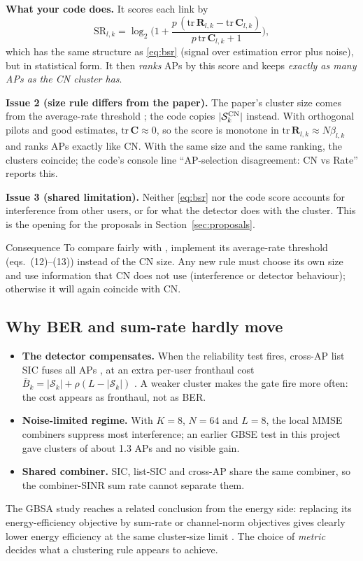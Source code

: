 \documentclass[11pt]{article}
\begin{document}
\textbf{What your code does.} It scores each link by
\begin{equation}
  \mathrm{SR}_{l,k}=\log_2\!\Big(1+\frac{p\,(\mathrm{tr}\,\mathbf R_{l,k}-\mathrm{tr}\,\mathbf C_{l,k})}{p\,\mathrm{tr}\,\mathbf C_{l,k}+1}\Big),
\end{equation}
which has the same structure as \eqref{eq:bsr} (signal over estimation error plus noise), but in statistical form. It then \emph{ranks} APs by this score and keeps \emph{exactly as many APs as the CN cluster has}.

\textbf{Issue 2 (size rule differs from the paper).} The paper's cluster size comes from the average-rate threshold \cite[eqs.~(12)--(13)]{mashdour2024study}; the code copies $|\mathcal S^{\rm CN}_k|$ instead. With orthogonal pilots and good estimates, $\mathrm{tr}\,\mathbf C\approx0$, so the score is monotone in $\mathrm{tr}\,\mathbf R_{l,k}\approx N\beta_{l,k}$ and ranks APs exactly like CN. With the same size and the same ranking, the clusters coincide; the code's console line ``AP-selection disagreement: CN vs Rate'' reports this.

\textbf{Issue 3 (shared limitation).} Neither \eqref{eq:bsr} nor the code score accounts for interference from other users, or for what the detector does with the cluster. This is the opening for the proposals in Section~\ref{sec:proposals}.

\begin{keybox}{Consequence}
To compare fairly with \cite{mashdour2024study}, implement its average-rate threshold (eqs.~(12)--(13)) instead of the CN size. Any new rule must choose its own size and use information that CN does not use (interference or detector behaviour); otherwise it will again coincide with CN.
\end{keybox}

\subsection{Why BER and sum-rate hardly move}
\begin{itemize}
  \item \textbf{The detector compensates.} When the reliability test fires, cross-AP list SIC fuses all APs \cite[Sec.~III-B]{haider2026vtc}, at an extra per-user fronthaul cost $\bar B_k=|\mathcal S_k|+\rho(L-|\mathcal S_k|)$ \cite[Sec.~III-B]{haider2026vtc}. A weaker cluster makes the gate fire more often: the cost appears as fronthaul, not as BER.
  \item \textbf{Noise-limited regime.} With $K=8$, $N=64$ and $L=8$, the local MMSE combiners suppress most interference; an earlier GBSE test in this project gave clusters of about 1.3 APs and no visible gain.
  \item \textbf{Shared combiner.} SIC, list-SIC and cross-AP share the same combiner, so the combiner-SINR sum rate cannot separate them.
\end{itemize}
The GBSA study reaches a related conclusion from the energy side: replacing its energy-efficiency objective by sum-rate or channel-norm objectives gives clearly lower energy efficiency at the same cluster-size limit \cite[Sec.~VI, Fig.~2]{tesolin2026gbsa}. The choice of \emph{metric} decides what a clustering rule appears to achieve.
\end{document}
